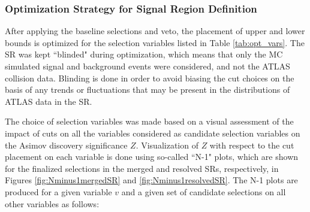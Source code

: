 \subsubsection{Optimization Strategy for Signal Region Definition}
\label{sec:sr_opt}

After applying the baseline selections and \bjet veto, the placement of upper and lower bounds is optimized for the selection variables listed in Table \ref{tab:opt_vars}. The SR was kept ``blinded" during optimization, which means that only the MC simulated signal and background events were considered, and not the ATLAS collision data. Blinding is done in order to avoid biasing the cut choices on the basis of any trends or fluctuations that may be present in the distributions of ATLAS data in the SR.  

The choice of selection variables was made based on a visual assessment of the impact of cuts on all the variables considered as candidate selection variables on the Asimov discovery significance \(Z\). Visualization of \(Z\) with respect to the cut placement on each variable is done using so-called ``N-1" plots, which are shown for the finalized selections in the merged and resolved SRs, respectively, in Figures \ref{fig:Nminus1mergedSR} and \ref{fig:Nminus1resolvedSR}. The N-1 plots are produced for a given variable \(v\) and a given set of candidate selections on all other variables as follows:

